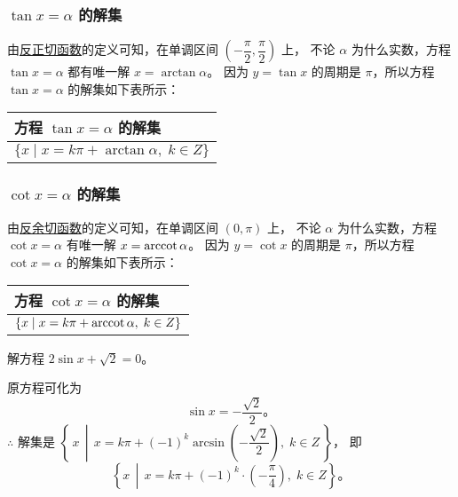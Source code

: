 \subsubsection{$\tan x = \alpha$ 的解集}

由\hyperref[subsec:1-3]{反正切函数}的定义可知，在单调区间 $\left( -\dfrac{\pi}{2}, \dfrac{\pi}{2} \right)$ 上，
不论 $\alpha$ 为什么实数，方程 $\tan x = \alpha$ 都有唯一解 $x = \arctan \alpha$。
因为 $y = \tan x$ 的周期是 $\pi$，所以方程 $\tan x = \alpha$ 的解集如下表所示：

\begin{table}[H]
    \centering
    \renewcommand\arraystretch{1.5}
    \begin{tabular}{|w{c}{20em}|}
        \hline
        方程 $\tan x = \alpha$ 的解集 \\ \hline
        $\{ x \mid x = k\pi + \arctan\alpha, \; k \in Z \}$ \\ \hline
    \end{tabular}
\end{table}


\subsubsection{$\cot x = \alpha$ 的解集}

由\hyperref[subsec:1-3]{反余切函数}的定义可知，在单调区间 $(0, \pi)$ 上，
不论 $\alpha$ 为什么实数，方程 $\cot x = \alpha$ 有唯一解 $x = \mathrm{arccot}\, \alpha$。
因为 $y = \cot x$ 的周期是 $\pi$，所以方程 $\cot x = \alpha$ 的解集如下表所示：

\begin{table}[H]
    \centering
    \renewcommand\arraystretch{1.5}
    \begin{tabular}{|w{c}{20em}|}
        \hline
        方程 $\cot x = \alpha$ 的解集 \\ \hline
        $\{ x \mid x = k\pi + \mathrm{arccot}\,\alpha, \; k \in Z \}$ \\ \hline
    \end{tabular}
\end{table}

\liti 解方程 $2\sin x + \sqrt{2} = 0$。

\jie 原方程可化为
$$ \sin x = -\dfrac{\sqrt{2}}{2} \text{。}$$
$\therefore$ 解集是 $\left\{\, x \,\middle|\, x = k\pi + (-1)^k \arcsin\left(-\dfrac{\sqrt{2}}{2}\right), \; k \in Z \,\right\}$，
即
$$ \left\{ x \,\middle|\, x = k\pi + (-1)^k \cdot \left( -\dfrac{\pi}{4} \right), \; k \in Z \right\} \text{。}$$


